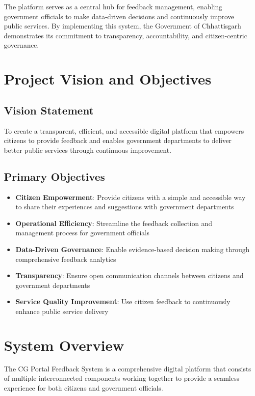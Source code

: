 \documentclass[12pt,a4paper]{article}
\begin{document}
The platform serves as a central hub for feedback management, enabling government officials to make data-driven decisions and continuously improve public services. By implementing this system, the Government of Chhattisgarh demonstrates its commitment to transparency, accountability, and citizen-centric governance.

\section{Project Vision and Objectives}

\subsection{Vision Statement}
To create a transparent, efficient, and accessible digital platform that empowers citizens to provide feedback and enables government departments to deliver better public services through continuous improvement.

\subsection{Primary Objectives}
\begin{itemize}[leftmargin=2em]
    \item \textbf{Citizen Empowerment}: Provide citizens with a simple and accessible way to share their experiences and suggestions with government departments
    \item \textbf{Operational Efficiency}: Streamline the feedback collection and management process for government officials
    \item \textbf{Data-Driven Governance}: Enable evidence-based decision making through comprehensive feedback analytics
    \item \textbf{Transparency}: Ensure open communication channels between citizens and government departments
    \item \textbf{Service Quality Improvement}: Use citizen feedback to continuously enhance public service delivery
\end{itemize}

\section{System Overview}

The CG Portal Feedback System is a comprehensive digital platform that consists of multiple interconnected components working together to provide a seamless experience for both citizens and government officials.
\end{document}
